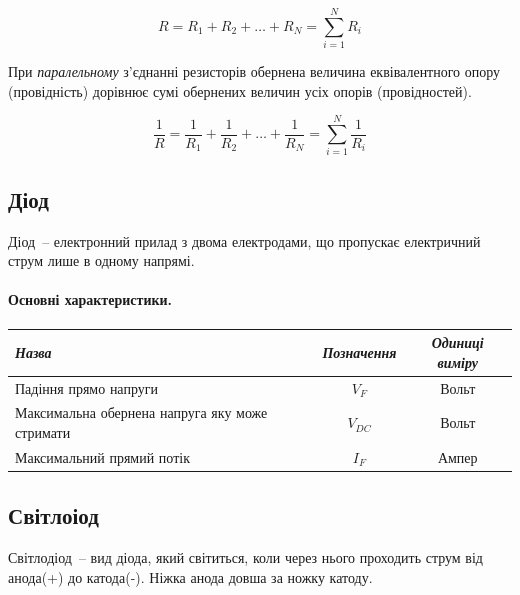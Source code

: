 \documentclass[12pt,a4paper]{book}  %
\begin{document}
    $$R=R_{1}+R_{2}+\dots +R_{N}=\sum _{i=1}^{N}R_{i}$$
    
При \textit{паралельному} з'єднанні резисторів обернена величина еквівалентного опору (провідність) дорівнює сумі обернених величин усіх опорів (провідностей).

    $$ \frac{1}{R} = \frac{1}{R_{1}}+\frac{1}{R_{2}}+ \dots + \frac{1}{R_{N}}= \sum_{i=1}^{N}\frac{1}{R_{i}}$$

\subsection{Діод}

Діод~-- електронний прилад з двома електродами, що пропускає електричний струм лише в одному напрямі. 

\paragraph{Основні характеристики.}

\begin{center}
\begin{tabular}{|l|c|c|}
\hline
\textit{Назва} & \textit{Позначення} & \textit{Одиниці виміру} \\
\hline
Падіння прямо напруги & $V_F$ & Вольт \\
\hline		
Максимальна обернена напруга яку може стримати & $V_{DC}$ & Вольт \\
\hline
Максимальний прямий потік & $I_F$ & Ампер \\
\hline
\end{tabular}
\end{center}


\subsection{Світлоіод}

Світлодіод~-- вид діода, який світиться, коли через нього проходить струм від анода(+) до катода(-). Ніжка анода довша за ножку катоду.
\end{document}
